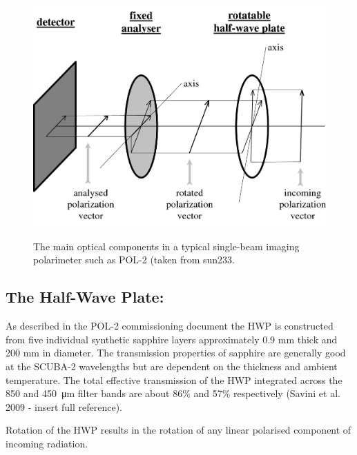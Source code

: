\begin{figure}[t!]
\begin{center}
\includegraphics[width=0.8\linewidth]{singopt.png}
\label{fig:pol2sc2diagram}
\caption [POL-2 optical components]{
  \small The main optical components in a typical single-beam imaging polarimeter such as POL-2 (taken from sun233.}
\end{center}
\end{figure}

\subsection*{The Half-Wave Plate:}

As described in the POL-2 commissioning document
the HWP is constructed from five individual synthetic sapphire layers approximately 0.9
mm thick and 200 mm in diameter. The transmission properties of sapphire
are generally good at the SCUBA-2 wavelengths but are dependent on the thickness and ambient
temperature. The total effective transmission of the HWP integrated across the 850
and \SI{450}{\micro\metre} filter bands are about 86\% and 57\% respectively
(Savini et al. 2009 - insert full reference).


Rotation of the HWP results in the rotation of any linear polarised component of incoming radiation.



